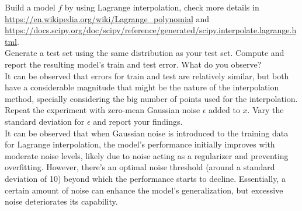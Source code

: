 \documentclass[a4paper]{article}
\theoremstyle{definition}
\begin{document}
Build a model $f$ by using Lagrange interpolation, check more details in \url{https://en.wikipedia.org/wiki/Lagrange_polynomial} and \url{https://docs.scipy.org/doc/scipy/reference/generated/scipy.interpolate.lagrange.html}. \\

Generate a test set using the same distribution as your test set. Compute and report the resulting model’s train and test error. What do you observe?\\

It can be observed that errors for train and test are relatively similar, but both have a considerable magnitude that might be the nature of the interpolation method, specially considering the big number of points used for the interpolation.\\

Repeat the experiment with zero-mean Gaussian noise $\epsilon$ added to $x$. Vary the standard deviation for $\epsilon$ and report your findings.\\

It can be observed that when Gaussian noise is introduced to the training data for Lagrange interpolation, the model's performance initially improves with moderate noise levels, likely due to noise acting as a regularizer and preventing overfitting. However, there's an optimal noise threshold (around a standard deviation of 10) beyond which the performance starts to decline. Essentially, a certain amount of noise can enhance the model's generalization, but excessive noise deteriorates its capability.


\end{document}
